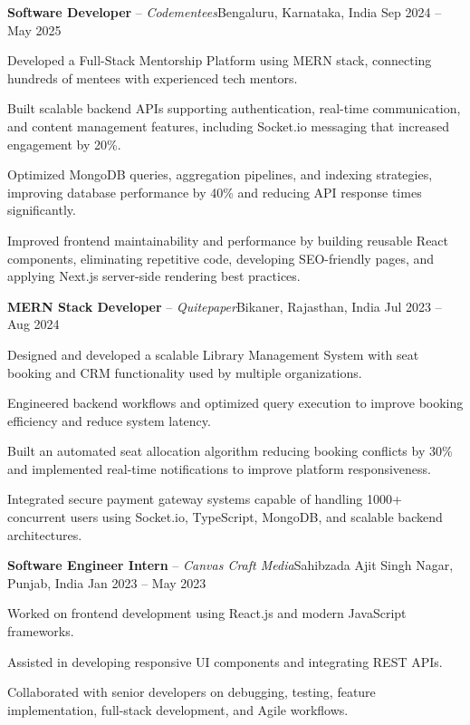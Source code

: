 \documentclass[10pt,a4paper]{moderncv}
\newcommand*{\role}[4]{
  \textbf{#1} -- {\itshape #2}\hfill{\small #3 \textbar{} #4}\\[-0.7mm]
}
\begin{document}
\begin{minipage}[t]{0.66\textwidth}
\role{Software Developer}{Codementees}{Bengaluru, Karnataka, India}{Sep 2024 -- May 2025}
\begin{resitemize}
  \item Developed a Full-Stack Mentorship Platform using MERN stack, connecting hundreds of mentees with experienced tech mentors.
  \item Built scalable backend APIs supporting authentication, real-time communication, and content management features, including Socket.io messaging that increased engagement by 20\%.
  \item Optimized MongoDB queries, aggregation pipelines, and indexing strategies, improving database performance by 40\% and reducing API response times significantly.
  \item Improved frontend maintainability and performance by building reusable React components, eliminating repetitive code, developing SEO-friendly pages, and applying Next.js server-side rendering best practices.
\end{resitemize}

\role{MERN Stack Developer}{Quitepaper}{Bikaner, Rajasthan, India}{Jul 2023 -- Aug 2024}
\begin{resitemize}
  \item Designed and developed a scalable Library Management System with seat booking and CRM functionality used by multiple organizations.
  \item Engineered backend workflows and optimized query execution to improve booking efficiency and reduce system latency.
  \item Built an automated seat allocation algorithm reducing booking conflicts by 30\% and implemented real-time notifications to improve platform responsiveness.
  \item Integrated secure payment gateway systems capable of handling 1000+ concurrent users using Socket.io, TypeScript, MongoDB, and scalable backend architectures.
\end{resitemize}

\role{Software Engineer Intern}{Canvas Craft Media}{Sahibzada Ajit Singh Nagar, Punjab, India}{Jan 2023 -- May 2023}
\begin{resitemize}
  \item Worked on frontend development using React.js and modern JavaScript frameworks.
  \item Assisted in developing responsive UI components and integrating REST APIs.
  \item Collaborated with senior developers on debugging, testing, feature implementation, full-stack development, and Agile workflows.
\end{resitemize}


\end{minipage}
\end{document}
